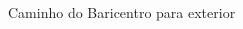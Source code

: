 \documentclass[aspectratio=169,usenames,dvipsnames]{beamer}
\begin{document}
\begin{frame}{Caminho do Baricentro para exterior}
\begin{columns}
\begin{column}{0.5\textwidth}
\begin{figure}
\begin{overprint}
        \end{overprint}
      \end{figure}
    \end{column}
  \end{columns}
  
\end{frame}
\end{document}
